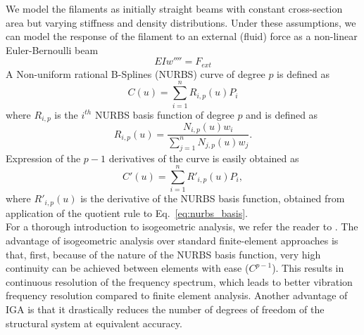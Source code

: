 \documentclass{jfm}
\begin{document}
We model the filaments as initially straight beams with constant cross-section area but varying stiffness and density distributions. Under these assumptions, we can model the response of the filament to an external (fluid) force as a non-linear Euler-Bernoulli beam
\begin{equation}
    EIw'''' = F_{ext}
\end{equation}
A Non-uniform rational B-Splines (NURBS) curve of degree $p$ is defined as
\begin{equation}
    C(u) = \sum_{i=1}^{n} R_{i,p}(u)P_i
\end{equation}
where $R_{i,p}$ is the $i^{th}$ NURBS basis function of degree $p$ and is defined as
\begin{equation}\label{eq:nurbs_basis}
    R_{i,p}(u) = \frac{N_{i,p}(u)w_i}{\sum_{j=1}^{n}N_{j,p}(u)w_j}.
\end{equation}
Expression of the $p-1$ derivatives of the curve is easily obtained as
\begin{equation}
    C'(u) = \sum_{i=1}^{n} R'_{i,p}(u)P_i,
\end{equation}
where $R'_{i,p}(u)$ is the derivative of the NURBS basis function, obtained from application of the quotient rule to Eq.~\ref{eq:nurbs_basis}.\\

For a thorough introduction to isogeometric analysis, we refer the reader to \cite{Cottrell2006IsogeometricVibrations}. The advantage of isogeometric analysis over standard finite-element approaches is that, first, because of the nature of the NURBS basis function, very high continuity can be achieved between elements with ease ($C^{p-1}$). This results in continuous resolution of the frequency spectrum, which leads to better vibration frequency resolution compared to finite element analysis. Another advantage of IGA is that it drastically reduces the number of degrees of freedom of the structural system at equivalent accuracy.
\end{document}
